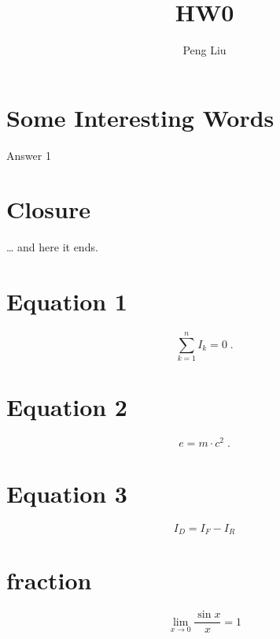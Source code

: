 \documentclass[letter,11pt,leqno]{article}
\author{Peng Liu}
\title{HW0}
\begin{document}
\maketitle
\tableofcontents
\section{Some Interesting Words}
Answer 1
\section{Closure}
\ldots{} and here it ends.

\section{Equation 1}
\begin{equation}
  \sum_{k=1}^{n} I_k = 0 \; .
\end{equation}

\section{Equation 2}
\begin{equation}
  e = m \cdot c^2 \; .
\end{equation}

\section{Equation 3}
\begin{equation}
  I_D = I_F - I_R
\end{equation}

\section{fraction}
\begin{equation*}
  \lim_{x \rightarrow 0}
  \frac{\sin x}{x}=1
\end{equation*}
\end{document}
